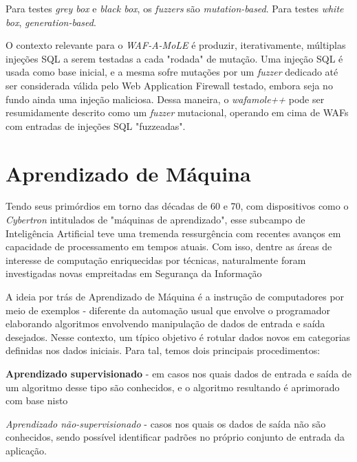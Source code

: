Para testes \textit{grey box} e \textit{black box}, os \textit{fuzzers} são \textit{mutation-based}. Para testes \textit{white box}, \textit{generation-based}.

O contexto relevante para o \textit{WAF-A-MoLE} é produzir, iterativamente, múltiplas injeções SQL a serem testadas a cada "rodada" de mutação. Uma injeção SQL é usada como base inicial, e a mesma sofre mutações por um \textit{fuzzer} dedicado até ser considerada válida pelo Web Application Firewall testado, embora seja no fundo ainda uma injeção maliciosa. Dessa maneira, o \textit{wafamole++} pode ser resumidamente descrito como um \textit{fuzzer} mutacional, operando em cima de WAFs com entradas de injeções SQL "fuzzeadas".

\section{Aprendizado de Máquina}

Tendo seus primórdios em torno das décadas de 60 e 70, com dispositivos como o \textit{Cybertron} intitulados de "máquinas de aprendizado", esse subcampo de Inteligência Artificial teve uma tremenda ressurgência com recentes avanços em capacidade de processamento em tempos atuais. Com isso, dentre as áreas de interesse de computação enriquecidas por técnicas, naturalmente foram investigadas novas empreitadas em Segurança da Informação

A ideia por trás de Aprendizado de Máquina \cite{dantas_transformers_2021} é a instrução de computadores por meio de exemplos - diferente da automação usual que envolve o programador elaborando algoritmos envolvendo manipulação de dados de entrada e saída desejados. Nesse contexto, um típico objetivo é rotular dados novos em categorias definidas nos dados iniciais. Para tal, temos dois principais procedimentos:
\begin{alineas}
\item \textbf{Aprendizado supervisionado} - em casos nos quais dados de entrada e saída de um algoritmo desse tipo são conhecidos, e o algoritmo resultando é aprimorado com base nisto
\item \textit{Aprendizado não-supervisionado} - casos nos quais os dados de saída não são conhecidos, sendo possível identificar padrões no próprio conjunto de entrada da aplicação.
\end{alineas}

